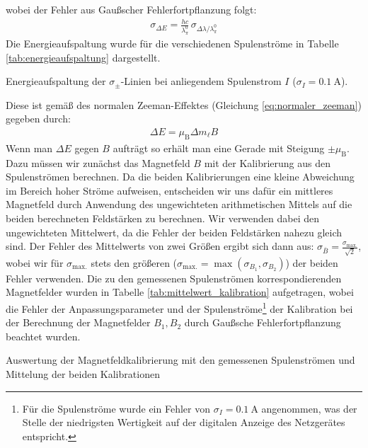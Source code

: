 \documentclass[11pt, a4paper]{article}
\begin{document}
wobei der Fehler aus Gaußscher Fehlerfortpflanzung folgt:
\begin{align}
	\sigma_{\Delta E} = \frac{h c}{\lambda_\pi^0} \, \sigma_{\Delta \lambda / \lambda_\pi^0}
\end{align}
Die Energieaufspaltung wurde für die verschiedenen Spulenströme in Tabelle \ref{tab:energieaufspaltung} dargestellt.
\begin{table}[h]
	\centering
	
	\caption{Energieaufspaltung der $\sigma_\pm$-Linien bei anliegendem Spulenstrom $I$ ($\sigma_I = \SI{0.1}{\ampere}$).}
	\label{tab:energieaufspaltung}
\end{table}
Diese ist gemäß des normalen Zeeman-Effektes (Gleichung \ref{eq:normaler_zeeman}) gegeben durch:
\begin{align}
	\Delta E = \mu_\mathrm{B} \Delta m_\ell B
	\label{eq:normaler_zeeman_auswertung}
\end{align}
Wenn man $\Delta E$ gegen $B$ aufträgt so erhält man eine Gerade mit Steigung $\pm \mu_\mathrm{B}$.
Dazu müssen wir zunächst das Magnetfeld $B$ mit der Kalibrierung aus den Spulenströmen berechnen.
Da die beiden Kalibrierungen eine kleine Abweichung im Bereich hoher Ströme aufweisen, entscheiden wir uns dafür ein mittleres Magnetfeld durch Anwendung des ungewichteten arithmetischen Mittels auf die beiden berechneten Feldstärken zu berechnen.
Wir verwenden dabei den ungewichteten Mittelwert, da die Fehler der beiden Feldstärken nahezu gleich sind.
Der Fehler des Mittelwerts von zwei Größen ergibt sich dann aus: $\sigma_{\bar{B}} = \frac{\sigma_\mathrm{max.}}{\sqrt{2}}$, wobei wir für $\sigma_\mathrm{max.}$ stets den größeren ($\sigma_\mathrm{max.} = \max(\sigma_{B_1}, \sigma_{B_2}) $) der beiden Fehler verwenden.
Die zu den gemessenen Spulenströmen korrespondierenden Magnetfelder wurden in Tabelle \ref{tab:mittelwert_kalibration} aufgetragen, wobei die Fehler der Anpassungsparameter und der Spulenströme\footnote{Für die Spulenströme wurde ein Fehler von $\sigma_I = \SI{0.1}{\ampere}$ angenommen, was der Stelle der niedrigsten Wertigkeit auf der digitalen Anzeige des Netzgerätes entspricht.} der Kalibration bei der Berechnung der Magnetfelder $B_1, B_2$ durch Gaußsche Fehlerfortpflanzung beachtet wurden.
\begin{table}[h]
	\centering
	
	\caption{Auswertung der Magnetfeldkalibrierung mit den gemessenen Spulenströmen und Mittelung der beiden Kalibrationen}
	\label{tab:mittelwert_kalibration}
\end{table}
\end{document}
